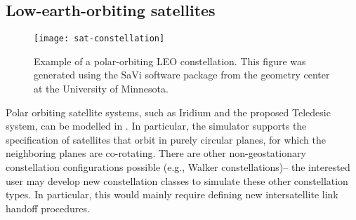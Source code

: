 
\subsection{Low-earth-orbiting satellites}
\label{sec:satellite/overview/leo}

\begin{figure}
    \centerline{\texttt{[image: sat-constellation]}}
    \caption{Example of a polar-orbiting LEO constellation.  This figure
was generated using the SaVi software package from the geometry center at the
University of Minnesota.}
    \label{fig:constellation}
\end{figure}

Polar orbiting satellite systems, such as Iridium and the proposed Teledesic 
system, can
be modelled in \ns.   In particular, the simulator supports the specification
of satellites that orbit in purely circular planes, for which the neighboring 
planes are co-rotating.
There are other non-geostationary constellation configurations  
possible (e.g., Walker constellations)-- the interested user may develop new
constellation classes to simulate these other constellation types.  In
particular, this would mainly require defining new intersatellite link 
handoff procedures.

